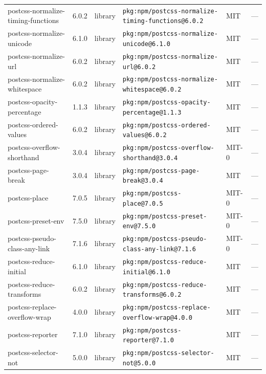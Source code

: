 \documentclass[11pt,a4paper]{article}
\begin{document}
\begin{longtable}{|p{4cm}|p{2cm}|p{1.6cm}|p{5cm}|p{1.5cm}|p{3.5cm}|}
\raggedright postcss-normalize-timing-functions & 6.0.2 & library & \small\texttt{pkg:npm/postcss-normalize-timing-functions@6.0.2} & MIT & \small — \\
\raggedright postcss-normalize-unicode & 6.1.0 & library & \small\texttt{pkg:npm/postcss-normalize-unicode@6.1.0} & MIT & \small — \\
\raggedright postcss-normalize-url & 6.0.2 & library & \small\texttt{pkg:npm/postcss-normalize-url@6.0.2} & MIT & \small — \\
\raggedright postcss-normalize-whitespace & 6.0.2 & library & \small\texttt{pkg:npm/postcss-normalize-whitespace@6.0.2} & MIT & \small — \\
\raggedright postcss-opacity-percentage & 1.1.3 & library & \small\texttt{pkg:npm/postcss-opacity-percentage@1.1.3} & MIT & \small — \\
\raggedright postcss-ordered-values & 6.0.2 & library & \small\texttt{pkg:npm/postcss-ordered-values@6.0.2} & MIT & \small — \\
\raggedright postcss-overflow-shorthand & 3.0.4 & library & \small\texttt{pkg:npm/postcss-overflow-shorthand@3.0.4} & MIT-0 & \small — \\
\raggedright postcss-page-break & 3.0.4 & library & \small\texttt{pkg:npm/postcss-page-break@3.0.4} & MIT & \small — \\
\raggedright postcss-place & 7.0.5 & library & \small\texttt{pkg:npm/postcss-place@7.0.5} & MIT-0 & \small — \\
\raggedright postcss-preset-env & 7.5.0 & library & \small\texttt{pkg:npm/postcss-preset-env@7.5.0} & MIT-0 & \small — \\
\raggedright postcss-pseudo-class-any-link & 7.1.6 & library & \small\texttt{pkg:npm/postcss-pseudo-class-any-link@7.1.6} & MIT-0 & \small — \\
\raggedright postcss-reduce-initial & 6.1.0 & library & \small\texttt{pkg:npm/postcss-reduce-initial@6.1.0} & MIT & \small — \\
\raggedright postcss-reduce-transforms & 6.0.2 & library & \small\texttt{pkg:npm/postcss-reduce-transforms@6.0.2} & MIT & \small — \\
\raggedright postcss-replace-overflow-wrap & 4.0.0 & library & \small\texttt{pkg:npm/postcss-replace-overflow-wrap@4.0.0} & MIT & \small — \\
\raggedright postcss-reporter & 7.1.0 & library & \small\texttt{pkg:npm/postcss-reporter@7.1.0} & MIT & \small — \\
\raggedright postcss-selector-not & 5.0.0 & library & \small\texttt{pkg:npm/postcss-selector-not@5.0.0} & MIT & \small — \\

\end{longtable}
\end{document}
